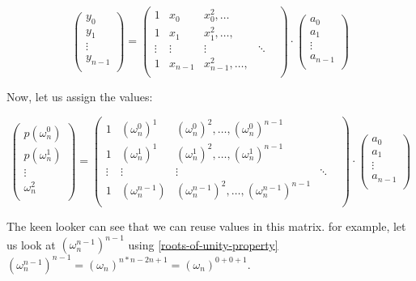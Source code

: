 $$
\begin{pmatrix}
  y_0\\
  y_1\\
  \vdots \\
  y_{n-1}\\
\end{pmatrix}
=
\begin{pmatrix}
  1 & x_0 & x_0^2 ,\dots\\
  1 & x_1 & x_1^2, \dots,\\
  \vdots & \vdots & \vdots & \ddots & \\
  1 & x_{n-1} & x_{n-1}^2, \dots,\\
 \end{pmatrix}
 \cdot 
\begin{pmatrix}
  a_0\\
  a_1\\
  \vdots \\
  a_{n-1}\\
\end{pmatrix}
 $$

 Now, let us assign the values:

 \label{dft-matrix}
 $$
\begin{pmatrix}
  p(\omega_n^0)\\
  p(\omega_n^1)\\
  \vdots \\
  \omega_n^2\\
\end{pmatrix}
=
\begin{pmatrix}
  1 & (\omega_n^0)^1 & (\omega_n^0)^2 ,\dots ,(\omega_n^0)^{n-1}\\
  1 & (\omega_n^1)^1 & (\omega_n^1)^2, \dots, (\omega_n^1)^{n-1}\\
  \vdots & \vdots & \vdots & \ddots & \\
  1 & (\omega_n^{n-1}) & (\omega_n^{n-1})^2, \dots,(\omega_n^{n-1})^{n-1}\\
 \end{pmatrix}
 \cdot 
\begin{pmatrix}
  a_0\\
  a_1\\
  \vdots \\
  a_{n-1}\\
\end{pmatrix}
 $$

 The keen looker can see that we can reuse values in this matrix.
 for example, let us look at $(\omega_n^{n-1})^{n-1}$ using \ref{roots-of-unity-property}
 $(\omega_n^{n-1})^{n-1} = (\omega_n)^{n*n-2n+1}=(\omega_n)^{0+0+1}$.  

